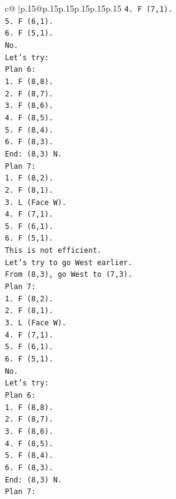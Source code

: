 \documentclass{article}
\begin{document}
{\begin{supertabular}{c@{$\;$}|p{.15\linewidth}@{}p{.15\linewidth}p{.15\linewidth}p{.15\linewidth}p{.15\linewidth}p{.15\linewidth}}
{{{\texttt{4. F (7,1).} \\
\texttt{5. F (6,1).} \\
\texttt{6. F (5,1).} \\
\texttt{No.} \\
\texttt{Let's try:} \\
\texttt{Plan 6:} \\
\texttt{1. F (8,8).} \\
\texttt{2. F (8,7).} \\
\texttt{3. F (8,6).} \\
\texttt{4. F (8,5).} \\
\texttt{5. F (8,4).} \\
\texttt{6. F (8,3).} \\
\texttt{End: (8,3) N.} \\
\texttt{Plan 7:} \\
\texttt{1. F (8,2).} \\
\texttt{2. F (8,1).} \\
\texttt{3. L (Face W).} \\
\texttt{4. F (7,1).} \\
\texttt{5. F (6,1).} \\
\texttt{6. F (5,1).} \\
\texttt{This is not efficient.} \\
\texttt{Let's try to go West earlier.} \\
\texttt{From (8,3), go West to (7,3).} \\
\texttt{Plan 7:} \\
\texttt{1. F (8,2).} \\
\texttt{2. F (8,1).} \\
\texttt{3. L (Face W).} \\
\texttt{4. F (7,1).} \\
\texttt{5. F (6,1).} \\
\texttt{6. F (5,1).} \\
\texttt{No.} \\
\texttt{Let's try:} \\
\texttt{Plan 6:} \\
\texttt{1. F (8,8).} \\
\texttt{2. F (8,7).} \\
\texttt{3. F (8,6).} \\
\texttt{4. F (8,5).} \\
\texttt{5. F (8,4).} \\
\texttt{6. F (8,3).} \\
\texttt{End: (8,3) N.} \\
\texttt{Plan 7:} \\
}}}
\end{supertabular}}
\end{document}
